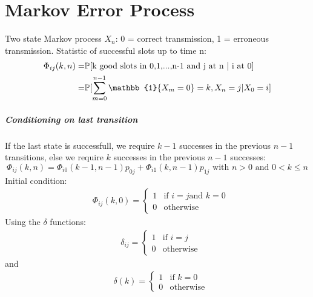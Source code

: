 \chapter{Markov Error Process}
Two state Markov process $X_n$: 0 = correct transmission, 1 = erroneous transmission. Statistic of successful slots up to time n:
\begin{equation}
	\begin{split}
			\Phi_{ij}(k,n) = & \prob[\textrm{k good slots in 0,1,...,n-1 and j at n | i at 0}] \\
										 = & \prob[\sum\limits_{m=0}^{n-1} \mathbb{1}\{X_m = 0\} = k, X_n = j | X_0 = i]
	\end{split}
\end{equation}
\paragraph{Conditioning on last transition}
If the last state is successfull, we require $k-1$ successes in the previous $n-1$ transitions, else we require $k$ successes in the previous $n-1$ successes:
$$\Phi_{ij}(k,n) = \Phi_{i0}(k-1,n-1)p_{0j} + \Phi_{i1}(k,n-1)p_{1j} \textrm{ with } n>0 \textrm{ and } 0<k\leq n$$
Initial condition:
\begin{equation}
 \begin{split}
	 &\Phi_{ij}(k,0)=
	 \begin{cases}
		 1 &  \text{if } i = j \text{and } k = 0 \\
		 0 &  \text{otherwise}
	 \end{cases}
 \end{split}
\end{equation}
Using the $\delta$ functions:
\begin{equation*}
 \begin{split}
	 &\delta_{ij}=
	 \begin{cases}
		 1 &  \text{if } i = j \\
		 0 &  \text{otherwise}
	 \end{cases}
 \end{split}
\end{equation*}
and
\begin{equation*}
 \begin{split}
	 &\delta(k)=
	 \begin{cases}
		 1 &  \text{if } k = 0 \\
		 0 &  \text{otherwise}
	 \end{cases}
 \end{split}
\end{equation*}
